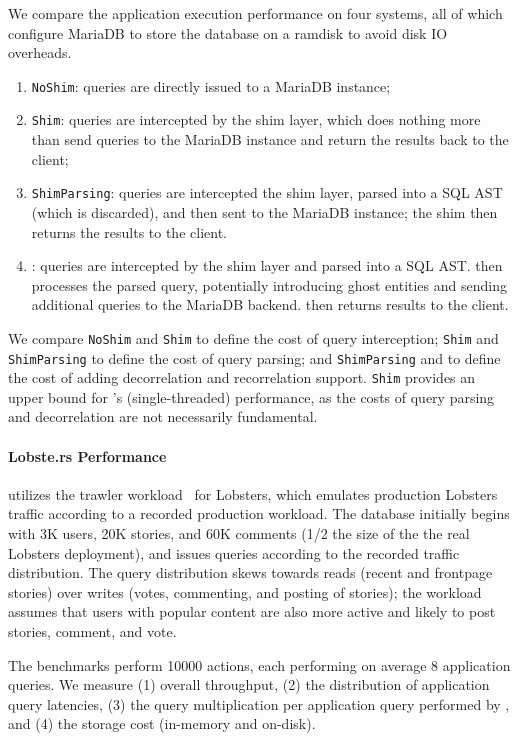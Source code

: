 We compare the application execution performance on four systems, all of which configure MariaDB to
store the database on a ramdisk to avoid disk IO overheads.
\begin{enumerate}
    \item \texttt{NoShim}: queries are directly issued to a MariaDB instance;
    \item \texttt{Shim}: queries are intercepted by the shim layer,
        which does nothing more than send queries to the MariaDB instance and
        return the results back to the client;
    \item \texttt{ShimParsing}: queries are intercepted the shim layer, parsed into a
        SQL AST (which is discarded), and then sent to the MariaDB instance; the shim then returns the results to the
        client.
    \item \texttt{\sys}: queries are intercepted by the shim layer and parsed into a SQL AST. \sys
        then processes the parsed query, potentially introducing ghost entities and sending additional queries to the MariaDB backend.
        \sys then returns results to the client.
\end{enumerate}

We compare \texttt{NoShim} and \texttt{Shim} to define the cost of query interception; \texttt{Shim}
and \texttt{ShimParsing} to define the cost of query parsing; and \texttt{ShimParsing} and
\texttt{\sys} to define the cost of adding decorrelation and recorrelation support.  \texttt{Shim}
provides an upper bound for \sys's (single-threaded) performance, as the costs of query parsing
and decorrelation are not necessarily fundamental.

\paragraph{Lobste.rs Performance}
\sys utilizes the trawler workload~\cite{trawler} for Lobsters, which emulates production
Lobsters traffic according to a recorded production workload. The database initially begins with 3K
users, 20K stories, and 60K comments (1/2 the size of the the real Lobsters deployment), and issues
queries according to the recorded traffic distribution. The query distribution skews towards reads
(recent and frontpage stories) over writes (votes, commenting, and posting of stories); the
workload assumes that users with popular content are also more active and likely to post stories,
comment, and vote.

The benchmarks perform 10000 actions, each performing on average 8 application queries.
We measure (1) overall throughput, (2) the distribution of application query
latencies, (3) the query multiplication per application query performed by \sys, and (4) the
storage cost (in-memory and on-disk).

